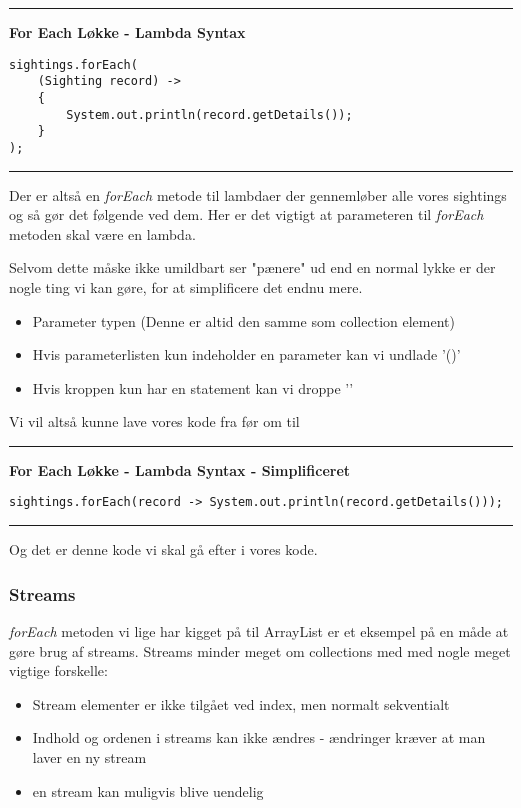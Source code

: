 \documentclass{article}
\begin{document}
\vspace{0.3em}\hrule\vspace{0.3em}
\textbf{For Each Løkke - Lambda Syntax}
\begin{verbatim}
sightings.forEach(
    (Sighting record) -> 
    {
        System.out.println(record.getDetails());
    }
);
\end{verbatim}
\vspace{0.3em}\hrule

Der er altså en \textit{forEach} metode til lambdaer der gennemløber alle vores sightings og så gør det følgende ved dem. Her er det vigtigt at parameteren til \textit{forEach} metoden skal være en lambda.

Selvom dette måske ikke umildbart ser "pænere" ud end en normal lykke er der nogle ting vi kan gøre, for at simplificere det endnu mere.
\begin{itemize}
    \item Parameter typen (Denne er altid den samme som collection element)
    \item Hvis parameterlisten kun indeholder en parameter kan vi undlade '()'
    \item Hvis kroppen kun har en statement kan vi droppe '{}'
\end{itemize}

Vi vil altså kunne lave vores kode fra før om til

\vspace{0.3em}\hrule\vspace{0.3em}
\textbf{For Each Løkke - Lambda Syntax - Simplificeret}
\begin{verbatim}
sightings.forEach(record -> System.out.println(record.getDetails()));
\end{verbatim}
\vspace{0.3em}\hrule

Og det er denne kode vi skal gå efter i vores kode.

\subsubsection*{Streams}
\textit{forEach} metoden vi lige har kigget på til ArrayList er et eksempel på en måde at gøre brug af streams. Streams minder meget om collections med med nogle meget vigtige forskelle:
\begin{itemize}
    \item Stream elementer er ikke tilgået ved index, men normalt sekventialt
    \item Indhold og ordenen i streams kan ikke ændres - ændringer kræver at man laver en ny stream
    \item en stream kan muligvis blive uendelig
\end{itemize}
\end{document}
